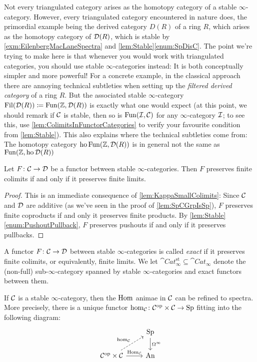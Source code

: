 \begin{numpar}
	Not every triangulated category arises as the homotopy category of a stable $\infty$-category. However, every triangulated category encountered in nature does, the primordial example being the derived category $D(R)$ of a ring $R$, which arises as the homotopy category of $\mathcal{D}(R)$, which is stable by \cref{exm:EilenbergMacLaneSpectra} and \cref{lem:Stable}\cref{enum:SpDisC}. The point we're trying to make here is that whenever you would work with triangulated categories, you should use stable $\infty$-categories instead: It is both conceptually simpler and more powerful! For a concrete example, in the classical approach there are annoying technical subtleties when setting up the \emph{filtered derived category} of a ring $R$. But the associated stable $\infty$-category $\operatorname{Fil}(\mathcal{D}(R))\coloneqq \operatorname{Fun}(\mathbb{Z},\mathcal{D}(R))$ is exactly what one would expect (at this point, we should remark if $\mathcal{C}$ is stable, then so is $\operatorname{Fun}(\mathcal{I},\mathcal{C})$ for any $\infty$-category $\mathcal{I}$; to see this, use \cref{lem:ColimitsInFunctorCategories} to verify your favourite condition from \cref{lem:Stable}). This also explains where the technical subtleties come from: The homotopy category $\operatorname{ho}\operatorname{Fun}(\mathbb{Z},\mathcal{D}(R))$ is in general not the same as $\operatorname{Fun}(\mathbb{Z},\operatorname{ho}\mathcal{D}(R))$
\end{numpar}
\begin{cor}\label{cor:Exact}
	Let $F\colon \mathcal{C}\rightarrow\mathcal{D}$ be a functor between stable $\infty$-categories. Then $F$ preserves finite colimits if and only if it preserves finite limits.
\end{cor}
\begin{proof}
	This is an immediate consequence of \cref{lem:KappaSmallColimits}: Since $\mathcal{C}$ and $\mathcal{D}$ are additive (as we've seen in the proof of \cref{lem:SpCGrpIsSp}), $F$ preserves finite coproducts if and only it preserves finite products. By \cref{lem:Stable}\cref{enum:PushoutPullback}, $F$ preserves pushouts if and only if it preserves pullbacks.
\end{proof}
\begin{defi}\label{def:Exact}
	A functor $F\colon \mathcal{C}\rightarrow\mathcal{D}$ between stable $\infty$-categories is called \emph{exact} if it preserves finite colimits, or equivalently, finite limits. We let $\cat{Cat}_{\infty}^\mathrm{st}\subseteq\cat{Cat}_\infty$ denote the (non-full) sub-$\infty$-category spanned by stable $\infty$-categories and exact functors between them.
\end{defi}
\begin{lem}\label{cor:hom}
	If $\mathcal{C}$ is a stable $\infty$-category, then the $\operatorname{Hom}$ animae in $\mathcal{C}$ can be refined to spectra. More precisely, there is a unique  functor $\hom_{\mathcal{C}}\colon \mathcal{C}^{\mathrm{op}}\times\mathcal{C}\rightarrow\mathrm{Sp}$ fitting into the following diagram:
	\begin{equation*}
		\begin{tikzcd}
			& \cat{Sp}\dar["\Omega^\infty"]\\
			\Cc^\op\times\Cc\urar[dashed,"\hom_\Cc"]\rar["\Hom_\Cc"] & \cat{An} 
		\end{tikzcd}
	\end{equation*}
\end{lem}
